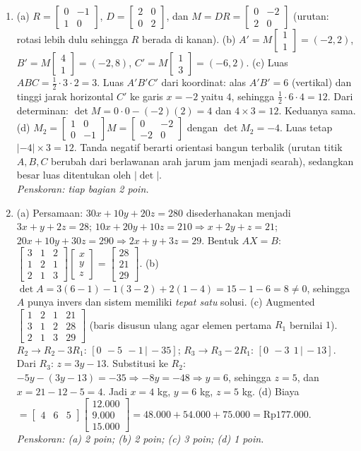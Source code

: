 \documentclass[a4paper,11pt]{article}
\newcommand{\sm}[1]{\left[\begin{smallmatrix}#1\end{smallmatrix}\right]}
\begin{document}
\small\begin{enumerate}[leftmargin=2em,itemsep=3pt,topsep=2pt]
\item[\textbf{1.}] (a) $R=\sm{0&-1\\1&0}$, $D=\sm{2&0\\0&2}$, dan $M=DR=\sm{0&-2\\2&0}$ (urutan: rotasi lebih dulu sehingga $R$ berada di kanan). (b) $A'=M\sm{1\\1}=(-2,2)$, $B'=M\sm{4\\1}=(-2,8)$, $C'=M\sm{1\\3}=(-6,2)$. (c) Luas $ABC=\frac12\cdot3\cdot2=3$. Luas $A'B'C'$ dari koordinat: alas $A'B'=6$ (vertikal) dan tinggi jarak horizontal $C'$ ke garis $x=-2$ yaitu $4$, sehingga $\frac12\cdot6\cdot4=12$. Dari determinan: $\det M=0\cdot0-(-2)(2)=4$ dan $4\times3=12$. Keduanya sama. (d) $M_2=\sm{1&0\\0&-1}M=\sm{0&-2\\-2&0}$ dengan $\det M_2=-4$. Luas tetap $|{-4}|\times3=12$. Tanda negatif berarti orientasi bangun terbalik (urutan titik $A,B,C$ berubah dari berlawanan arah jarum jam menjadi searah), sedangkan besar luas ditentukan oleh $|\det|$. \\ \textit{Penskoran: tiap bagian 2 poin.}
\item[\textbf{2.}] (a) Persamaan: $30x+10y+20z=280$ disederhanakan menjadi $3x+y+2z=28$; $10x+20y+10z=210\Rightarrow x+2y+z=21$; $20x+10y+30z=290\Rightarrow2x+y+3z=29$. Bentuk $AX=B$: $\sm{3&1&2\\1&2&1\\2&1&3}\sm{x\\y\\z}=\sm{28\\21\\29}$. (b) $\det A=3(6-1)-1(3-2)+2(1-4)=15-1-6=8\neq0$, sehingga $A$ punya invers dan sistem memiliki \emph{tepat satu} solusi. (c) Augmented $\left[\begin{array}{ccc|c}1&2&1&21\\3&1&2&28\\2&1&3&29\end{array}\right]$ (baris disusun ulang agar elemen pertama $R_1$ bernilai $1$). $R_2\to R_2-3R_1$: $[0\ \,-5\ \,-1\,|\,-35]$; $R_3\to R_3-2R_1$: $[0\ \,-3\ \ 1\,|\,-13]$. Dari $R_3$: $z=3y-13$. Substitusi ke $R_2$: $-5y-(3y-13)=-35\Rightarrow-8y=-48\Rightarrow y=6$, sehingga $z=5$, dan $x=21-12-5=4$. Jadi $x=4$ kg, $y=6$ kg, $z=5$ kg. (d) Biaya $=\begin{bmatrix}4&6&5\end{bmatrix}\begin{bmatrix}12.000\\9.000\\15.000\end{bmatrix}=48.000+54.000+75.000=\text{Rp}177.000$. \\ \textit{Penskoran: (a) 2 poin; (b) 2 poin; (c) 3 poin; (d) 1 poin.}

\end{enumerate}
\end{document}
